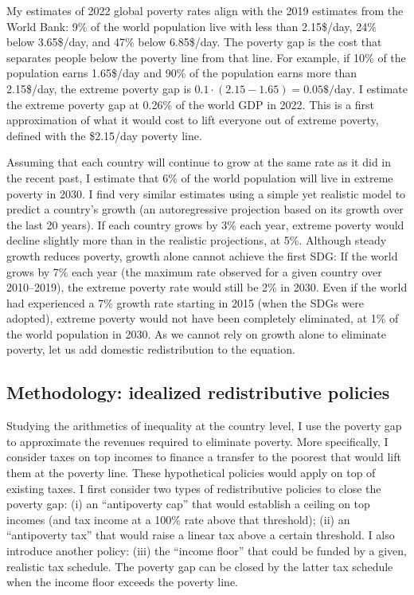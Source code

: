 

My estimates of 2022 global poverty rates align with the 2019 estimates from the World Bank: 9\% of the world population live with less than 2.15\$/day, 24\% below 3.65\$/day, and 47\% below 6.85\$/day. 
The poverty gap is the cost that separates people below the poverty line from that line. For example, if 10\% of the population earns 1.65\$/day and 90\% of the population earns more than 2.15\$/day, the extreme poverty gap is $0.1 \cdot (2.15 - 1.65) = 0.05\$/\text{day}$. %
I estimate the extreme poverty gap at 0.26\% of the world GDP in 2022. This is a first approximation of what it would cost to lift everyone out of extreme poverty, defined with the \$2.15/day poverty line. 

Assuming that each country will continue to grow at the same rate as it did in the recent past, %
I estimate that 6\% of the world population will live in extreme poverty in 2030. I find very similar estimates using a simple yet realistic model to predict a country's growth (an autoregressive projection based on its growth over the last 20 years). 
If each country grows by 3\% each year, extreme poverty would decline slightly more than in the realistic projections, at 5\%. 
Although steady growth reduces poverty, growth alone cannot achieve the first SDG: If the world grows by 7\% each year (the maximum rate observed for a given country over 2010--2019), %
the extreme poverty rate would still be 2\% in 2030. Even if the world had experienced a 7\% growth rate starting in 2015 (when the SDGs were adopted), extreme poverty would not have been completely eliminated, at 1\% of the world population in 2030. 
As we cannot rely on growth alone to eliminate poverty, let us add domestic redistribution to the equation. 

\subsection{Methodology: idealized redistributive policies\label{subsec:method}}

Studying the arithmetics of inequality at the country level, I use the poverty gap to approximate the revenues required to eliminate poverty. 
More specifically, I consider taxes on top incomes to finance a transfer to the poorest that would lift them at the poverty line. These hypothetical policies would apply on top of existing taxes. I first consider two types of redistributive policies to close the poverty gap: (i) an ``antipoverty cap'' that would establish a ceiling on top incomes (and tax income at a 100\% rate above that threshold); (ii) an ``antipoverty tax'' that would raise a linear tax above a certain threshold. I also introduce another policy: (iii) the ``income floor'' that could be funded by a given, realistic tax schedule. The poverty gap can be closed by the latter tax schedule when the income floor exceeds the poverty line. 

